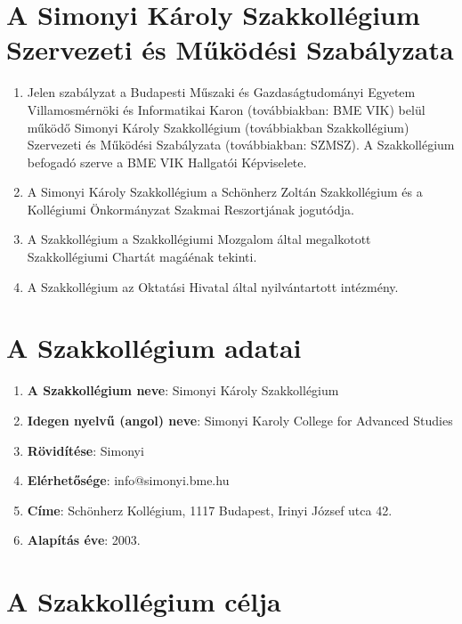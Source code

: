 \documentclass[12pt]{report}
\begin{document}
\FirstPage
\pagebreak

\section{A Simonyi Károly Szakkollégium Szervezeti és Működési Szabályzata}

\begin{enumerate}
  \item Jelen szabályzat a Budapesti Műszaki és Gazdaságtudományi Egyetem Villamosmérnöki és Informatikai Karon (továbbiakban: BME VIK) belül 
    működő Simonyi Károly Szakkollégium (továbbiakban Szakkollégium) Szervezeti és Működési Szabályzata (továbbiakban: SZMSZ). A Szakkollégium 
    befogadó szerve a BME VIK Hallgatói Képviselete.
  \item A Simonyi Károly Szakkollégium a Schönherz Zoltán Szakkollégium és a Kollégiumi Önkormányzat Szakmai Reszortjának jogutódja.
  \item A Szakkollégium a Szakkollégiumi Mozgalom által megalkotott Szakkollégiumi Chartát magáénak tekinti.
  \item A Szakkollégium az Oktatási Hivatal által nyilvántartott intézmény.
\end{enumerate}

\section{A Szakkollégium adatai}

\begin{enumerate}
  \item \textbf{A Szakkollégium neve}: Simonyi Károly Szakkollégium
  \item \textbf{Idegen nyelvű (angol) neve}: Simonyi Karoly College for Advanced Studies
  \item \textbf{Rövidítése}: Simonyi
  \item \textbf{Elérhetősége}: info@simonyi.bme.hu
  \item \textbf{Címe}: Schönherz Kollégium, 1117 Budapest, Irinyi József utca 42.
  \item \textbf{Alapítás éve}: 2003.
\end{enumerate}


\section{A Szakkollégium célja}
\end{document}
